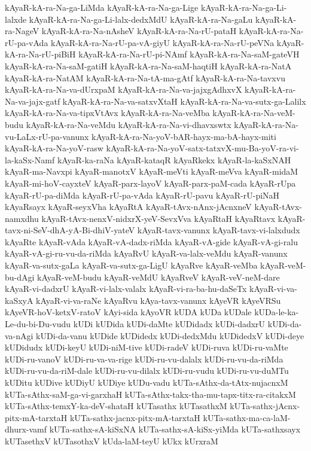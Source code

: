 {kAyaR-kA-ra-Na-ga-LiMda
kAyaR-kA-ra-Na-ga-Lige
kAyaR-kA-ra-Na-ga-Li-lalxde
kAyaR-kA-ra-Na-ga-Li-lalx-dedxMdU
kAyaR-kA-ra-Na-gaLu
kAyaR-kA-ra-NageV
kAyaR-kA-ra-Na-nAsheV
kAyaR-kA-ra-Na-rU-pataH
kAyaR-kA-ra-Na-rU-pa-vAda
kAyaR-kA-ra-Na-rU-pa-vA-giyU
kAyaR-kA-ra-Na-rU-peVNa
kAyaR-kA-ra-Na-rU-piBiH
kAyaR-kA-ra-Na-rU-pi-NAmf
kAyaR-kA-ra-Na-saM-gateVH
kAyaR-kA-ra-Na-saM-gatiH
kAyaR-kA-ra-Na-saM-haqtiH
kAyaR-kA-ra-NatA
kAyaR-kA-ra-NatAM
kAyaR-kA-ra-Na-tA-ma-gAtf
kAyaR-kA-ra-Na-tavxvu
kAyaR-kA-ra-Na-va-dUrxpaM
kAyaR-kA-ra-Na-va-jajxgAdhxvX
kAyaR-kA-ra-Na-va-jajx-gatf
kAyaR-kA-ra-Na-va-satxvXtaH
kAyaR-kA-ra-Na-va-sutx-ga-Lalilx
kAyaR-kA-ra-Na-va-tipxVtAvx
kAyaR-kA-ra-Na-veMba
kAyaR-kA-ra-Na-veM-budu
kAyaR-kA-ra-Na-veMdu
kAyaR-kA-ra-Na-vi-dhavxswtx
kAyaR-kA-ra-Na-vu-LaLx-rU-pa-vanunx
kAyaR-kA-ra-Na-yoV-bAR-hayx-ma-bA-hayx-miti
kAyaR-kA-ra-Na-yoV-rasw
kAyaR-kA-ra-Na-yoV-satx-tatxvX-mu-Ba-yoV-ra-vi-la-kaSx-Namf
kAyaR-ka-raNa
kAyaR-kataqR
kAyaRkekx
kAyaR-la-kaSxNAH
kAyaR-ma-Navxpi
kAyaR-manotxV
kAyaR-meVti
kAyaR-meVva
kAyaR-midaM
kAyaR-mi-hoV-cayxteV
kAyaR-parx-layoV
kAyaR-parx-paM-cada
kAyaR-rUpa
kAyaR-rU-pa-diMda
kAyaR-rU-pa-vAda
kAyaR-rU-pavu
kAyaR-rU-piNaH
kAyaRsayx
kAyaR-seyxVha
kAyaRtA
kAyaR-tAvx-nAnx-jAcnxneV
kAyaR-tAvx-namxdhu
kAyaR-tAvx-nenxV-nidxrX-yeV-SevxVva
kAyaRtaH
kAyaRtavx
kAyaR-tavx-ni-SeV-dhA-yA-Bi-dhiV-yateV
kAyaR-tavx-vanunx
kAyaR-tavx-vi-lalxdudx
kAyaRte
kAyaR-vAda
kAyaR-vA-dadx-riMda
kAyaR-vA-gide
kAyaR-vA-gi-ralu
kAyaR-vA-gi-ru-vu-da-riMda
kAyaRvU
kAyaR-va-lalx-veMdu
kAyaR-vanunx
kAyaR-va-sutx-gaLa
kAyaR-va-sutx-ga-LigU
kAyaRve
kAyaR-veMba
kAyaR-veM-bu-dAgi
kAyaR-veM-budu
kAyaR-veMdU
kAyaRveV
kAyaR-veV-neM-dare
kAyaR-vi-dadxrU
kAyaR-vi-lalx-valalx
kAyaR-vi-ra-ba-hu-daSeTx
kAyaR-vi-va-kaSxyA
kAyaR-vi-va-raNe
kAyaRvu
kAya-tavx-vanunx
kAyeVR
kAyeVRSu
kAyeVR-hoV-ketxV-ratoV
kAyi-sida
kAyoVR
kUDA
kUDa
kUDale
kUDa-le-ka-Le-du-bi-Du-vudu
kUDi
kUDida
kUDi-daMte
kUDidadx
kUDi-dadxrU
kUDi-da-va-nAgi
kUDi-da-vanu
kUDide
kUDidedx
kUDi-dedxMdu
kUDidedxV
kUDi-deye
kUDidudx
kUDi-keyU
kUDi-niM-tive
kUDi-radeV
kUDi-ruva
kUDi-ru-vaMte
kUDi-ru-vanoV
kUDi-ru-va-va-rige
kUDi-ru-vu-dalalx
kUDi-ru-vu-da-riMda
kUDi-ru-vu-da-riM-dale
kUDi-ru-vu-dilalx
kUDi-ru-vudu
kUDi-ru-vu-duMTu
kUDitu
kUDive
kUDiyU
kUDiye
kUDu-vadu
kUTa-sAthx-da-tAtx-nujacnxM
kUTa-sAthx-saM-ga-vi-garxhaH
kUTa-sAthx-takx-tha-mu-tapx-titx-ra-citakxM
kUTa-sAthx-temxY-ka-deV-shataH
kUTasathx
kUTasathxM
kUTa-sathx-jAcnx-pitx-mA-tarxtaH
kUTa-sathx-jacnx-pitx-mA-tarxtaH
kUTa-sathx-ma-ca-laM-dhurx-vamf
kUTa-sathx-sA-kiSxNA
kUTa-sathx-sA-kiSx-yiMda
kUTa-sathxsayx
kUTasethxV
kUTasothxV
kUda-laM-teyU
kUkx
kUrxraM
}
